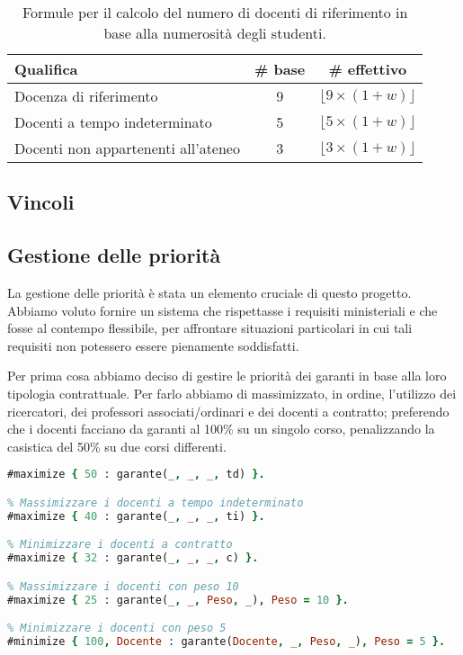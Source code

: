 \begin{table}[h]
    \centering
    \renewcommand{\arraystretch}{1.5}
    \begin{tabular}{|l|c|c|}
    \hline
    \textbf{Qualifica} & \textbf{\# base} & \textbf{\# effettivo} \\
    \hline
    Docenza di riferimento & 9 & $\lfloor 9 \times (1+w) \rfloor$ \\
    \hline
    Docenti a tempo indeterminato & 5 & $\lfloor 5 \times (1+w) \rfloor$ \\
    \hline
    Docenti non appartenenti all'ateneo & 3 & $\lfloor 3 \times (1+w) \rfloor$ \\
    \hline
    \end{tabular}
    \caption{Formule per il calcolo del numero di docenti di riferimento in base alla numerosità degli studenti.}
    \label{tab:formula-w}
\end{table}

\subsection{Vincoli}\label{sec:constraints}
\subsection{Gestione delle priorità}\label{sec:priorita}

La gestione delle priorità è stata un elemento cruciale di questo progetto.
Abbiamo voluto fornire un sistema che rispettasse i requisiti ministeriali e
che fosse al contempo flessibile, per affrontare situazioni particolari in cui
tali requisiti non potessero essere pienamente soddisfatti.

Per prima cosa abbiamo deciso di gestire le priorità dei garanti in base alla loro tipologia contrattuale.
Per farlo abbiamo di massimizzato, in ordine, l'utilizzo dei ricercatori, dei professori associati/ordinari e dei docenti a contratto;
preferendo che i docenti facciano da garanti al 100\% su un singolo corso, penalizzando la casistica
del 50\% su due corsi differenti.

\begin{lstlisting}[language=prolog, caption=Gestione delle priorità dei docenti]
% Massimizzare i docenti a tempo determinato (ricercatori)
#maximize { 50 : garante(_, _, _, td) }.

% Massimizzare i docenti a tempo indeterminato
#maximize { 40 : garante(_, _, _, ti) }.

% Minimizzare i docenti a contratto
#maximize { 32 : garante(_, _, _, c) }.

% Massimizzare i docenti con peso 10
#maximize { 25 : garante(_, _, Peso, _), Peso = 10 }.

% Minimizzare i docenti con peso 5
#minimize { 100, Docente : garante(Docente, _, Peso, _), Peso = 5 }.
\end{lstlisting}

